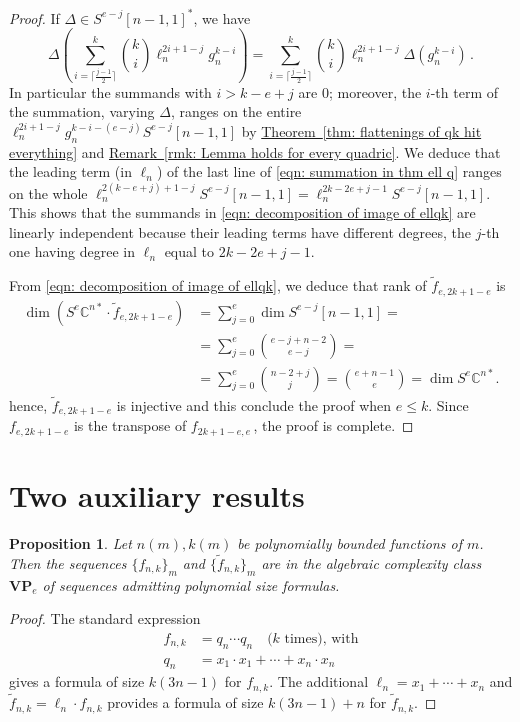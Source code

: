 \documentclass[11pt]{article}
\numberwithin{equation}{section}
\newtheorem{proposition}[theorem]{Proposition}
\theoremstyle{definition}
\theoremstyle{plain}
\newcommand{\expref}[2]{\hyperref[#2]{#1~\ref{#2}}}
\providecommand{\textbinom}{}
\renewcommand{\textbinom}[2]{{\textstyle \binom{#1}{#2}}}
\newcommand{\bbC}{\mathbb{C}}
\renewcommand{\tilde}[1]{\widetilde{#1}}
\newcommand{\bfVP}{\mathbf{VP}}
\begin{document}
\begin{proof}
If $\Delta \in S^{e-j} [n-1,1]^* $, we have
\[
  \Delta \left( \sum_{i=\lceil \frac{j-1}{2}\rceil}^k \textbinom{k}{i} \ell_n^{2i+1 - j} g_n^{k-i}\right) = \sum_{i=\lceil \frac{j-1}{2}\rceil}^{k} \textbinom{k}{i} \ell_n^{2i+1 - j} \Delta( g_n^{k-i})\,.
\]
In particular the summands with $i > k-e+j$ are $0$; moreover, the
$i$-th term of the summation, varying $\Delta$, ranges on the entire
$\ell_n^{2i+1-j} g_n^{k-i-(e-j)} S^{e-j} [n-1,1]$ by
\expref{Theorem}{thm: flattenings of qk hit everything} and
\expref{Remark}{rmk: Lemma holds for every quadric}. We deduce that
the leading term (in $\ell_n$) of the last line of \eqref{eqn:
  summation in thm ell q} ranges on the whole
$\ell_n^{2(k-e+j) +1 -j } S^{e-j} [n-1,1] = \ell_n^{2k-2e+j -1}
S^{e-j} [n-1,1]$. This shows that the summands in \eqref{eqn:
  decomposition of image of ellqk} are linearly independent because
their leading terms have different degrees, the $j$-th one having
degree in $\ell_n$ equal to $2k-2e+j -1$.

{}From \eqref{eqn: decomposition of image of ellqk}, we deduce that rank of $\tilde{f}_{e,2k+1-e}$ is 
\begin{align*}
 \dim (S^e \bbC^{n*} \cdot \tilde{f}_{e,2k+1-e} ) &= \sum_{j = 0}^e \dim S^{e-j} [n-1,1] = \\ &= \sum_{j=0}^e \binom{e-j+n-2}{e-j} = \\ &=\sum_{j=0}^e \binom{n-2+j}{j} = \binom{e+n-1}{e} = \dim S^e \bbC^{n*}.
\end{align*}
hence, $\tilde{f}_{e,2k+1-e}$ is injective and this conclude the proof when $e \leq k$. Since $f_{e,2k+1-e}$ is the transpose of $f_{2k+1-e,e}$\,, the proof is complete.
\end{proof}

\section{Two auxiliary results}
 
 
  \begin{proposition} \label{vpeprop}
 Let $n(m),k(m)$ be   polynomially bounded functions of $m$. Then the sequences $\{f_{n,k}\}_m$ and $\{\tilde f_{n,k}\}_m$ are   in the algebraic complexity class $\bfVP_e$ of sequences admitting polynomial size formulas.
 \end{proposition}  
 

\begin{proof}
The standard expression
\begin{align*}
f_{n,k} &= q_n \cdots q_n \quad \text{($k$ times), with} \\
q_n &= x_1 \cdot x_1 + \cdots + x_n \cdot x_n
\end{align*}
gives a formula of size $k(3n-1)$ for $f_{n,k}$. The additional $\ell_n = x_1 + \cdots + x_n$ and $\tilde{f}_{n,k} = \ell_n \cdot f_{n,k}$ provides a formula of size $k(3n-1)+n$ for $\tilde{f}_{n,k}$.
\end{proof}
\end{document}
